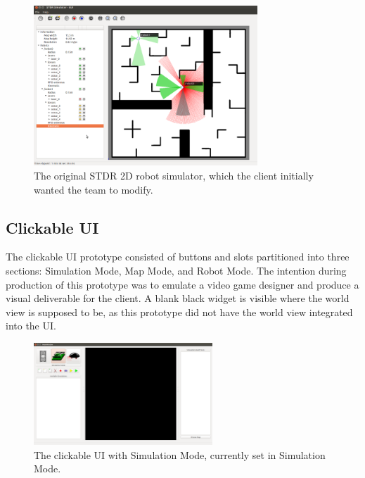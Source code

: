 \begin{figure}[!htb]
	\begin{center}
		\includegraphics[width=0.75\textwidth]{./Images/Sprint0_STDR}
	\end{center}
	\caption{The original STDR 2D robot simulator, which the client initially wanted the team to modify.  \label{stdr}}
\end{figure}

\subsection{Clickable UI}

The clickable UI prototype consisted of buttons and slots partitioned into three sections: Simulation Mode, Map Mode, and Robot Mode. The intention during production of this prototype was to emulate a video game designer and produce a visual deliverable for the client. A blank black widget is visible where the world view is supposed to be, as this prototype did not have the world view integrated into the UI.\newline\newline\newline
\newline\newline\newline
\newline\newline\newline

\begin{figure}[H]
	\begin{center}
		\includegraphics[width=0.60\textwidth]{./Images/Sprint1_clickableUI_SimulationMode}
	\end{center}
	\caption{The clickable UI with Simulation Mode, currently set in Simulation Mode.  \label{clickableuisimulation}}
\end{figure}

